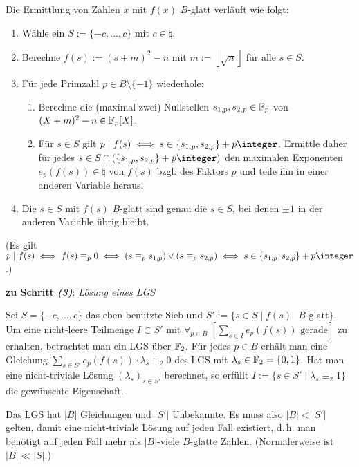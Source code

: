 Die Ermittlung von Zahlen $x$ mit $f(x)$ $B$-glatt verläuft wie folgt:
\begin{enumerate}
    \item
    Wähle ein  $S := \{-c, \dotsc, c\}$ mit $c \in \natural$.
    
    \item
    Berechne $f(s) := (s + m)^2 - n$ mit $m := \left\lfloor\sqrt{n}\right\rfloor$
    für alle $s \in S$.
    
    \item
    Für jede Primzahl $p \in B \setminus \{-1\}$ wiederhole:
    \begin{enumerate}
        \item
        Berechne die (maximal zwei) Nullstellen $s_{1,p}, s_{2,p} \in \mathbb{F}_p$ von
        $(X + m)^2 - n \in \mathbb{F}_p[X]$.
        
        \item
        Für $s \in S$ gilt $p \teilt f(s) \iff s \in \{s_{1,p}, s_{2,p}\} + p\integer$.
        Ermittle daher für jedes $s \in S \cap (\{s_{1,p}, s_{2,p}\} + p\integer)$ den maximalen
        Exponenten $e_p(f(s)) \in \natural$ von $f(s)$ bzgl. des Faktors $p$
        und teile ihn in einer anderen Variable heraus.
    \end{enumerate}
    
    \item
    Die $s \in S$ mit $f(s)$ $B$-glatt sind genau die $s \in S$, bei denen $\pm 1$ in der
    anderen Variable übrig bleibt.
\end{enumerate}
(Es gilt $p \teilt f(s) \iff f(s) \equiv_p 0 \iff (s \equiv_p s_{1,p}) \lor (s \equiv_p s_{2,p})
\iff s \in \{s_{1,p}, s_{2,p}\} + p\integer$.)

\linie
\pagebreak

\textbf{zu Schritt \emph{(3)}}:
\emph{Lösung eines LGS}

Sei $S = \{-c, \dotsc, c\}$ das eben benutzte Sieb und
$S' := \{s \in S \;|\; f(s) \text{ $B$-glatt}\}$.
Um eine nicht-leere Teilmenge $I \subset S'$ mit
$\forall_{p \in B}\; [\sum_{s \in I} e_p(f(s)) \text{ gerade}]$
zu erhalten, betrachtet man ein LGS über $\mathbb{F}_2$.
Für jedes $p \in B$ erhält man eine Gleichung
$\sum_{s \in S'} e_p(f(s)) \cdot \lambda_s \equiv_2 0$ des LGS
mit $\lambda_s \in \mathbb{F}_2 = \{0, 1\}$.
Hat man eine nicht-triviale Lösung $(\lambda_s)_{s \in S'}$ berechnet, so erfüllt
$I := \{s \in S' \;|\; \lambda_s \equiv_2 1\}$ die gewünschte Eigenschaft.

Das LGS hat $|B|$ Gleichungen und $|S'|$ Unbekannte.
Es muss also $|B| < |S'|$ gelten, damit eine nicht-triviale Lösung auf jeden Fall existiert,
d.\,h. man benötigt auf jeden Fall mehr als $|B|$-viele $B$-glatte Zahlen.
(Normalerweise ist $|B| \ll |S|$.)

